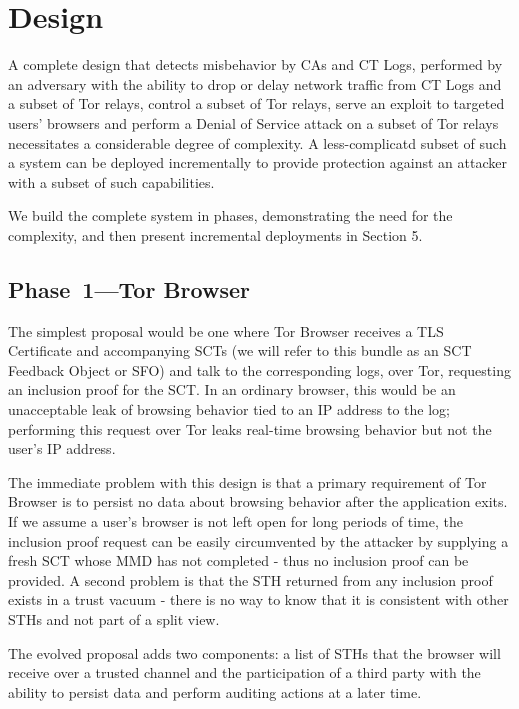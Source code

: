 \section{Design} \label{sec:base}

A complete design that detects misbehavior by CAs and CT Logs, performed by an adversary with the ability to drop or delay network traffic from CT Logs and a subset of Tor relays, control a subset of Tor relays, serve an exploit to targeted users' browsers and perform a Denial of Service attack on a subset of Tor relays necessitates a considerable degree of complexity. A less-complicatd subset of such a system can be deployed incrementally to provide protection against an attacker with a subset of such capabilities.

We build the complete system in phases, demonstrating the need for the complexity, and then present incremental deployments in Section 5.

\subsection{Phase~1---Tor Browser} \label{sec:base:phase1}

The simplest proposal would be one where Tor Browser receives a TLS Certificate and accompanying SCTs (we will refer to this bundle as an SCT Feedback Object or SFO) and talk to the corresponding logs, over Tor, requesting an inclusion proof for the SCT. In an ordinary browser, this would be an unacceptable leak of browsing behavior tied to an IP address to the log; performing this request over Tor leaks real-time browsing behavior but not the user's IP address.

The immediate problem with this design is that a primary requirement of Tor Browser is to persist no data about browsing behavior after the application exits. If we assume a user's browser is not left open for long periods of time, the inclusion proof request can be easily circumvented by the attacker by supplying a fresh SCT whose MMD has not completed - thus no inclusion proof can be provided. A second problem is that the STH returned from any inclusion proof exists in a trust vacuum - there is no way to know that it is consistent with other STHs and not part of a split view.

The evolved proposal adds two components: a list of STHs that the browser will receive over a trusted channel and the participation of a third party with the ability to persist data and perform auditing actions at a later time.

